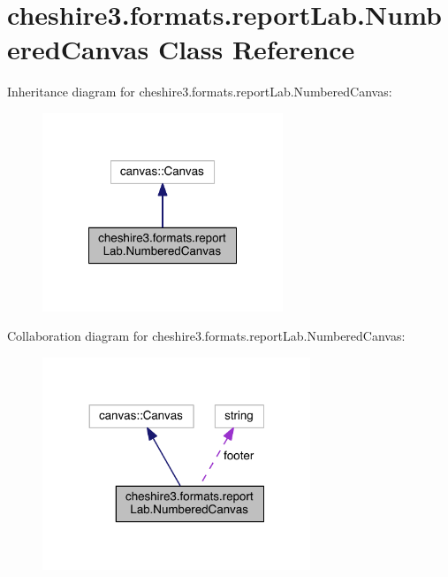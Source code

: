 \hypertarget{classcheshire3_1_1formats_1_1report_lab_1_1_numbered_canvas}{\section{cheshire3.\-formats.\-report\-Lab.\-Numbered\-Canvas Class Reference}
\label{classcheshire3_1_1formats_1_1report_lab_1_1_numbered_canvas}
}


Inheritance diagram for cheshire3.\-formats.\-report\-Lab.\-Numbered\-Canvas\-:
\nopagebreak
\begin{figure}[H]
\begin{center}
\leavevmode
\includegraphics[width=204pt]{classcheshire3_1_1formats_1_1report_lab_1_1_numbered_canvas__inherit__graph}
\end{center}
\end{figure}


Collaboration diagram for cheshire3.\-formats.\-report\-Lab.\-Numbered\-Canvas\-:
\nopagebreak
\begin{figure}[H]
\begin{center}
\leavevmode
\includegraphics[width=227pt]{classcheshire3_1_1formats_1_1report_lab_1_1_numbered_canvas__coll__graph}
\end{center}
\end{figure}
